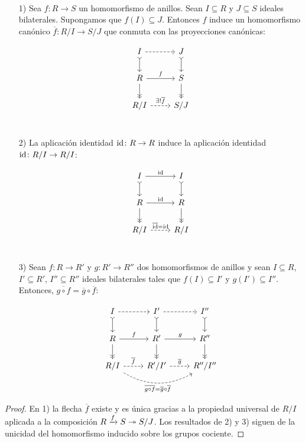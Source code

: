 \begin{corolario}
  \label{prop:funtorialidad-de-cocientes}
  ~

  \begin{enumerate}
  \item[1)] Sea $f\colon R\to S$ un homomorfismo de anillos.
    Sean $I \subseteq R$ y $J \subseteq S$ ideales bilaterales. Supongamos que
    $f (I) \subseteq J$. Entonces $f$ induce un homomorfismo canónico
    $\overline{f}\colon R/I \to S/J$ que conmuta con las proyecciones canónicas:

    \[ \begin{tikzcd}
        I\ar[dashed]{r}\ar[>->]{d} & J\ar[>->]{d} \\
        R\ar{r}{f}\ar[->>]{d} & S\ar[->>]{d} \\
        R/I\ar[dashed]{r}{\exists! \overline{f}} & S/J \\
      \end{tikzcd} \]

  \item[2)] La aplicación identidad $\mathrm{id}\colon R\to R$ induce la aplicación
    identidad $\mathrm{id}\colon R/I\to R/I$:

    \[ \begin{tikzcd}
        I\ar{r}{\idid}\ar[>->]{d} & I\ar[>->]{d} \\
        R\ar{r}{\idid}\ar[->>]{d} & R\ar[->>]{d} \\
        R/I\ar[dashed]{r}{\overline{\idid}=\idid} & R/I \\
      \end{tikzcd} \]

  \item[3)] Sean $f\colon R\to R'$ y $g\colon R'\to R''$ dos homomorfismos
    de anillos y sean $I\subseteq R$, $I'\subseteq R'$, $I''\subseteq R''$
    ideales bilaterales tales que $f (I) \subseteq I'$ y $g (I') \subseteq
    I''$. Entonces, $\overline{g\circ f} = \overline{g} \circ \overline{f}$:

    \[ \begin{tikzcd}
        I\ar[dashed]{r}\ar[>->]{d} & I'\ar[dashed]{r}\ar[>->]{d} & I''\ar[>->]{d} \\
        R\ar{r}{f}\ar[->>]{d} & R'\ar{r}{g}\ar[->>]{d} & R''\ar[->>]{d} \\
        R/I\ar[dashed]{r}{\overline{f}}\ar[dashed,bend right]{rr}[swap]{\overline{g\circ f} = \overline{g}\circ\overline{f}} & R'/I'\ar[dashed]{r}{\overline{g}} & R''/I'' \\
      \end{tikzcd} \]
  \end{enumerate}

  \begin{proof}
    En 1) la flecha $\overline{f}$ existe y es única gracias a la propiedad
    universal de $R/I$ aplicada a la composición $R\xrightarrow{f} S \twoheadrightarrow
    S/J$. Los resultados de 2) y 3) siguen de la unicidad del homomorfismo
    inducido sobre los grupos cociente.
  \end{proof}
\end{corolario}

